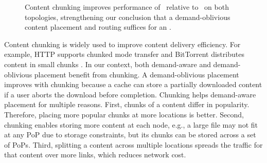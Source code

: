 {\begin{figure}[t]
\begin{center}
\end{center}
\caption{Content chunking improves performance of \invlru\ relative to \optrpfuture\ on both topologies, strengthening our conclusion that a demand-oblivious content placement and routing suffices for an \ncp.}
\label{fig:chunking}
\end{figure}

}

Content chunking is widely used to improve content delivery efficiency. For example, HTTP supports chunked mode transfer \cite{rfc2616}  and BitTorrent distributes content in small chunks \cite{bittorrentprotocol}. In our context, both demand-aware and demand-oblivious placement benefit from chunking. A demand-oblivious placement improves with chunking because  a cache can store a partially downloaded content if a user aborts the download before completion. Chunking helps demand-aware placement for multiple reasons. First, chunks of a content differ in popularity. Therefore,  placing more popular chunks at more locations is better. Second, chunking enables storing more content at each node, e.g., a large file may not  fit at any PoP due to storage constraints,  but its chunks can be stored across a set of PoPs.  Third, splitting a content across multiple locations spreads the traffic for that content over more links, which reduces network cost. 

